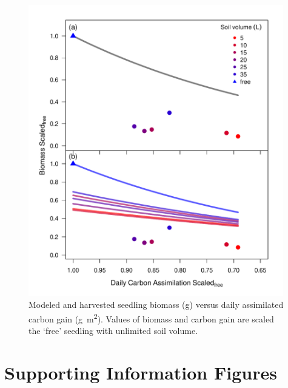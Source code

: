 \documentclass[a4paper]{article}\usepackage[]{graphicx}\usepackage[]{color}
\begin{document}
\begin{figure}[h!]
    \centering
    \includegraphics[width=0.99\textwidth]{gC_day.pdf}
    \caption{Modeled and harvested seedling biomass (g) versus daily assimilated carbon gain (g~m\textsuperscript{2}).  Values of biomass and carbon gain are scaled the ‘free’ seedling with unlimited soil volume.}
    \label{fig:figure6}
\end{figure}

\clearpage
\section{Supporting Information Figures}

\renewcommand\thefigure{S\arabic{figure}}    
\setcounter{figure}{0}   
\end{document}
